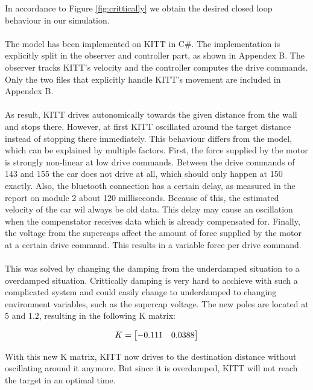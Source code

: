 \documentclass[final]{scrreprt} %
\begin{document}
In accordance to Figure \ref{fig:crittically} we obtain the desired closed loop behaviour in our simulation.
\\ \\
The model has been implemented on KITT in C\#. The implementation is explicitly split in the observer and controller part, as shown in Appendex B. The observer tracks KITT's velocity and the controller computes the drive commands. Only the two files that explicitly handle KITT's movement are included in Appendex B.
\\ \\
As result, KITT drives autonomically towards the given distance from the wall and stops there. However, at first KITT oscillated around the target distance instead of stopping there immediately. This behaviour differs from the model, which can be explained by multiple factors. First, the force supplied by the motor is strongly non-linear at low drive commands. Between the drive commands of 143 and 155 the car does not drive at all, which should only happen at 150 exactly. Also, the bluetooth connection has a certain delay, as measured in the report on module 2 about 120 milliseconds. Because of this, the estimated velocity of the car wil always be old data. This delay may cause an oscillation when the compenstator receives data which is already compensated for. Finally, the voltage from the supercaps affect the amount of force supplied by the motor at a certain drive command. This results in a variable force per drive command.
\\ \\
This was solved by changing the damping from the underdamped situation to a overdamped situation. Crittically damping is very hard to acchieve with such a complicated system and could easily change to underdamped to changing environment variables, such as the supercap voltage. The new poles are located at $5$ and $1.2$, resulting in the following K matrix:

\begin{equation}
\centering
K = 
\begin{bmatrix}
  -0.111 & 0.0388
\end{bmatrix}
\end{equation}

With this new K matrix, KITT now drives to the destination distance without oscillating around it anymore. But since it is overdamped, KITT will not reach the target in an optimal time.
\end{document}
